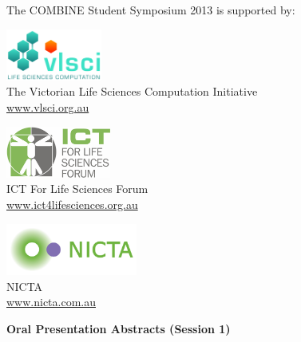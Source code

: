 \documentclass[10pt,]{article}
\begin{document}
\vspace{5ex}

\begin{minipage}[c]{\linewidth}
    \centering
    The COMBINE Student Symposium 2013 is supported by:\\[3ex]
    \begin{varwidth}[t]{0.33\linewidth}
        \centering
        \includegraphics[height=17mm,valign=M]{./images/logo_vlsci_3508x1890.jpg}\\[2ex]
        The Victorian Life Sciences Computation Initiative\\
        \href{http://www.vlsci.org.au}{www.vlsci.org.au}
    \end{varwidth}
    \qquad
    \begin{varwidth}[t]{0.33\linewidth}
        \centering
        \includegraphics[height=17mm,valign=M]{./images/ICT-for-Life-Sciences-Forum-logo.png}\\[2ex]
        ICT For Life Sciences Forum\\
        \href{http://ict4lifesciences.org.au/}{www.ict4lifesciences.org.au}
    \end{varwidth}
    \qquad
    \begin{varwidth}[t]{0.33\linewidth}
        \centering
        \includegraphics[height=17mm,valign=M]{./images/nicta_logo.png}\\[2ex]
        NICTA\\
        \href{http://nicta.com.au}{www.nicta.com.au}
    \end{varwidth}
    
\end{minipage}

\vfill
\pagebreak
\null
\vfill

\small

{\Large\bfseries\centering Oral Presentation Abstracts (Session 1)}\\[3ex]
\end{document}
